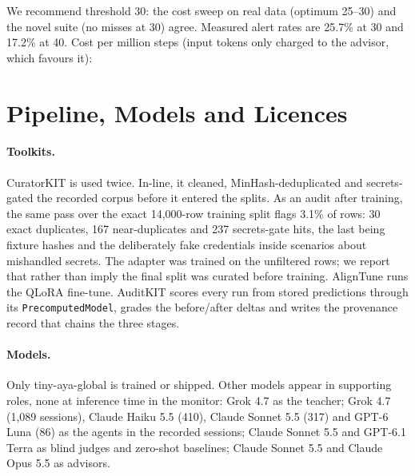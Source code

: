 \documentclass[11pt]{article}
\begin{document}
\noindent We recommend threshold 30: the cost sweep on real data (optimum 25--30) and the novel suite (no misses at 30) agree. Measured alert rates are 25.7\% at 30 and 17.2\% at 40. Cost per million steps (input tokens only charged to the advisor, which favours it):

\vspace{6pt}

\section{Pipeline, Models and Licences}\label{app:pipeline}

\paragraph{Toolkits.} CuratorKIT \citep{curatorkit} is used twice. In-line, it cleaned, MinHash-deduplicated and secrets-gated the recorded corpus before it entered the splits. As an audit after training, the same pass over the exact 14,000-row training split flags 3.1\% of rows: 30 exact duplicates, 167 near-duplicates and 237 secrets-gate hits, the last being fixture hashes and the deliberately fake credentials inside scenarios about mishandled secrets. The adapter was trained on the unfiltered rows; we report that rather than imply the final split was curated before training. AlignTune \citep{aligntune} runs the QLoRA fine-tune. AuditKIT \citep{auditkit} scores every run from stored predictions through its \texttt{PrecomputedModel}, grades the before/after deltas and writes the provenance record that chains the three stages.

\paragraph{Models.} Only tiny-aya-global is trained or shipped. Other models appear in supporting roles, none at inference time in the monitor: Grok 4.7 as the teacher; Grok 4.7 (1,089 sessions), Claude Haiku 5.5 (410), Claude Sonnet 5.5 (317) and GPT-6 Luna (86) as the agents in the recorded sessions; Claude Sonnet 5.5 and GPT-6.1 Terra as blind judges and zero-shot baselines; Claude Sonnet 5.5 and Claude Opus 5.5 as advisors.
\end{document}
